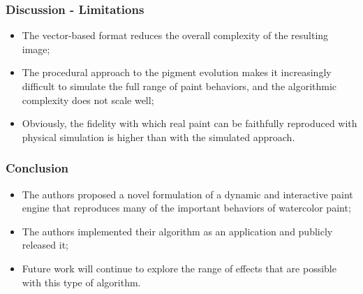\documentclass{beamer}
\begin{document}
\begin{frame}
    \frametitle{Discussion - Limitations}
    \begin{itemize}
        \item The vector-based format reduces the overall complexity of the
        resulting image;
        \item The procedural approach to the pigment evolution makes it
        increasingly difficult to simulate the full range of paint behaviors,
        and the algorithmic complexity does not scale well;
        \item Obviously, the fidelity with which real paint can be faithfully
        reproduced with physical simulation is higher than with the simulated
        approach.
    \end{itemize}
\end{frame}

\begin{frame}
    \frametitle{Conclusion}
    \begin{itemize}
        \item The authors proposed a novel formulation of a dynamic and
        interactive paint engine that reproduces many of the important
        behaviors of watercolor paint;
        \item The authors implemented their algorithm as an application
        and publicly released it;
        \item Future work will continue to explore the range of effects
        that are possible with this type of algorithm.
    \end{itemize}
\end{frame}
\end{document}
